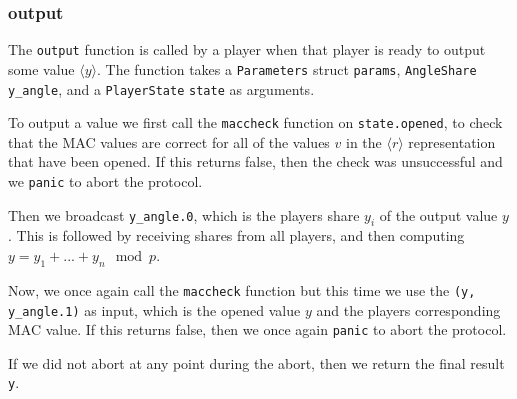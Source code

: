 \documentclass[../main.tex]{subfiles}
\begin{document}
\subsubsection{output}
The \lstinline{output} function is called by a player when that player is ready to output some value $\langle y \rangle$. The function takes a \lstinline{Parameters} struct \lstinline{params}, \lstinline{AngleShare} \lstinline{y_angle}, and a \lstinline{PlayerState} \lstinline{state} as arguments.

To output a value we first call the \lstinline{maccheck} function on \lstinline{state.opened}, to check that the MAC values are correct for all of the values $v$ in the $\langle r \rangle$ representation that have been opened. If this returns false, then the check was unsuccessful and we \lstinline{panic} to abort the protocol.

Then we broadcast \lstinline{y_angle.0}, which is the players share $y_i$ of the output value $y$. This is followed by receiving shares from all players, and then computing $y = y_1 + ... + y_n \mod p$.

Now, we once again call the \lstinline{maccheck} function but this time we use the \lstinline{(y, y_angle.1)} as input, which is the opened value $y$ and the players corresponding MAC value. If this returns false, then we once again \lstinline{panic} to abort the protocol.

If we did not abort at any point during the abort, then we return the final result \lstinline{y}.
\end{document}
